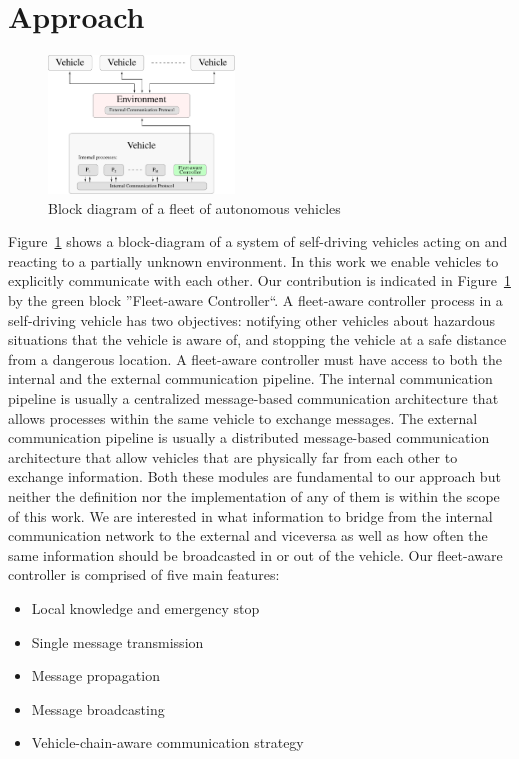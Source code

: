 \section{Approach}
\label{sec:solution}

\begin{figure}[t]
    \centering
    \vspace{0.2cm}
    \includegraphics[width=0.44\textwidth]{figures/model.pdf}
    \caption{Block diagram of a fleet of autonomous vehicles  \label{fig:model_block_diagram}}
\end{figure}

Figure~\ref{fig:model_block_diagram} shows a block-diagram of a system of self-driving vehicles acting on and reacting to
a partially unknown environment. In this work we enable vehicles to explicitly communicate with each other. Our contribution
is indicated in Figure~\ref{fig:model_block_diagram} by the green block ''Fleet-aware Controller``.
A fleet-aware controller process in a self-driving vehicle has two objectives: notifying other vehicles about
hazardous situations that the vehicle is aware of, and stopping the vehicle at a safe distance from a dangerous location.
A fleet-aware controller must have access to both the internal and the external communication pipeline. The internal communication
pipeline is usually a centralized message-based communication architecture that allows processes within the same vehicle to exchange
messages. The external communication pipeline is usually a distributed message-based communication architecture that allow
vehicles that are physically far from each other to exchange information.
Both these modules are fundamental to our approach but neither the definition nor the implementation of any of them is within
the scope of this work.
We are interested in what information to bridge from the internal communication network to the external and viceversa as well as
how often the same information should be broadcasted in or out of the vehicle.
Our fleet-aware controller is comprised of five main features:

\begin{itemize}
\item Local knowledge and emergency stop
\item Single message transmission
\item Message propagation
\item Message broadcasting
\item Vehicle-chain-aware communication strategy
\end{itemize}

